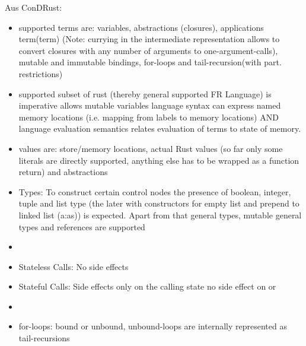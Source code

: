 Aus ConDRust:
\begin{itemize}
    \item supported terms are: variables, abstractions (closures), applications term(term) (Note: currying in the intermediate representation allows to convert closures with any number of arguments to one-argument-calls), mutable and immutable bindings, for-loops and tail-recursion(with part. restrictions)
    \item supported subset of rust (thereby general supported FR Language) is imperative \means allows mutable variables \means language syntax can express named memory locations (i.e. mapping from labels to memory locations) AND language evaluation semantics relates evaluation of terms to state of memory.
    \item values are: store/memory locations, actual Rust values (so far only some literals are directly supported, anything else has to be wrapped as a function return) and abstractions 
    \item Types: To construct certain control nodes the presence of boolean, integer, tuple and list type (the later with constructors for empty list and prepend to linked list (a:as)) is expected. Apart from that general types, mutable  general types and references are supported
    \item  {}
    \item Stateless Calls: No side effects
    \item Stateful Calls: Side effects only on the calling state  \means no side effect on  or  
    \item {}
\item for-loops: bound or unbound, unbound-loops are internally represented as tail-recursions  

\end{itemize}
